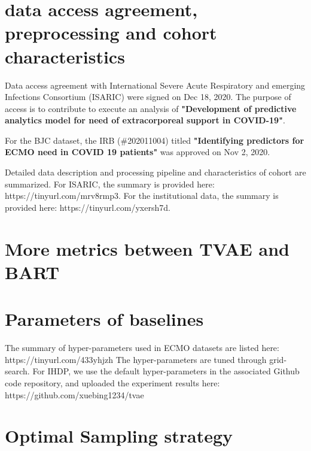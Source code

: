 \section{data access agreement, preprocessing and cohort characteristics}
Data access agreement with International Severe Acute Respiratory and emerging Infections
Consortium (ISARIC) were signed on Dec 18, 2020. The purpose of access is to contribute to execute an analysis of \textbf{"Development of predictive
analytics model for need of extracorporeal support in COVID-19"}. 

For the BJC dataset, the IRB (\#202011004) titled \textbf{"Identifying predictors for ECMO need in COVID 19 patients"} was approved on Nov 2, 2020. 

Detailed data description and processing pipeline and characteristics of cohort are summarized. For ISARIC, the summary is provided here: https://tinyurl.com/mrv8rmp3. For the institutional data, the summary is provided here: https://tinyurl.com/yxersh7d.
\section{More metrics between TVAE and BART}

\section{Parameters of baselines}
The summary of hyper-parameters used in ECMO datasets are listed here: https://tinyurl.com/433yhjzh The hyper-parameters are tuned through grid-search. For IHDP, we use the default hyper-parameters in the associated Github code repository, and uploaded the experiment results here: https://github.com/xuebing1234/tvae
\section{Optimal Sampling strategy}

\clearpage

